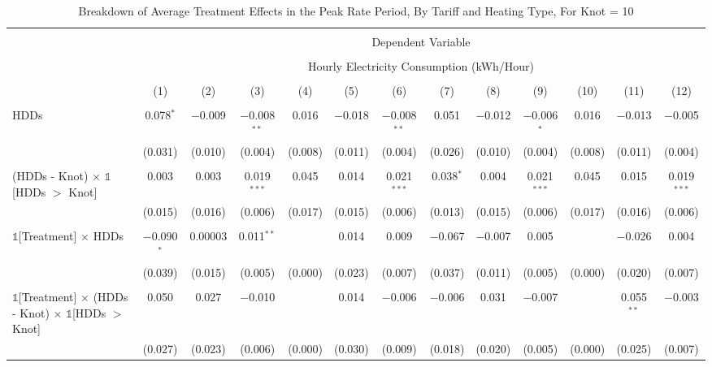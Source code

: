 
\begin{table}[!htbp] \centering 
  \caption{Breakdown of Average Treatment Effects in the Peak Rate Period, By Tariff and Heating Type, For Knot = 10} 
  \label{Table:Breakdown-of-Average-Treatment-Effects-in-the-Peak-Rate-Period_By-Tariff-and-Heating-Type_Knot-10} 
\small 
\begin{tabular}{@{\extracolsep{20pt}}lcccccccccccc} 
\\[-1.8ex]\hline 
\hline \\[-1.8ex] 
 & \multicolumn{12}{c}{Dependent Variable} \\ 
\cline{2-13} 
\\[-1.8ex] & \multicolumn{12}{c}{Hourly Electricity Consumption  (kWh/Hour)} \\ 
\\[-1.8ex] & (1) & (2) & (3) & (4) & (5) & (6) & (7) & (8) & (9) & (10) & (11) & (12)\\ 
\hline \\[-1.8ex] 
 HDDs & 0.078$^{*}$ & $-$0.009 & $-$0.008$^{**}$ & 0.016 & $-$0.018 & $-$0.008$^{**}$ & 0.051 & $-$0.012 & $-$0.006$^{*}$ & 0.016 & $-$0.013 & $-$0.005 \\ 
  & (0.031) & (0.010) & (0.004) & (0.008) & (0.011) & (0.004) & (0.026) & (0.010) & (0.004) & (0.008) & (0.011) & (0.004) \\ 
  & & & & & & & & & & & & \\ 
 (HDDs - Knot) $\times$ $\mathbb{1}$[HDDs $>$ Knot] & 0.003 & 0.003 & 0.019$^{***}$ & 0.045 & 0.014 & 0.021$^{***}$ & 0.038$^{*}$ & 0.004 & 0.021$^{***}$ & 0.045 & 0.015 & 0.019$^{***}$ \\ 
  & (0.015) & (0.016) & (0.006) & (0.017) & (0.015) & (0.006) & (0.013) & (0.015) & (0.006) & (0.017) & (0.016) & (0.006) \\ 
  & & & & & & & & & & & & \\ 
 $\mathbb{1}$[Treatment] $\times$ HDDs & $-$0.090$^{*}$ & 0.00003 & 0.011$^{**}$ &  & 0.014 & 0.009 & $-$0.067 & $-$0.007 & 0.005 &  & $-$0.026 & 0.004 \\ 
  & (0.039) & (0.015) & (0.005) & (0.000) & (0.023) & (0.007) & (0.037) & (0.011) & (0.005) & (0.000) & (0.020) & (0.007) \\ 
  & & & & & & & & & & & & \\ 
 $\mathbb{1}$[Treatment] $\times$ (HDDs - Knot) $\times$ $\mathbb{1}$[HDDs $>$ Knot] & 0.050 & 0.027 & $-$0.010 &  & 0.014 & $-$0.006 & $-$0.006 & 0.031 & $-$0.007 &  & 0.055$^{**}$ & $-$0.003 \\ 
  & (0.027) & (0.023) & (0.006) & (0.000) & (0.030) & (0.009) & (0.018) & (0.020) & (0.005) & (0.000) & (0.025) & (0.007) \\ 

\end{tabular}
\end{table}
